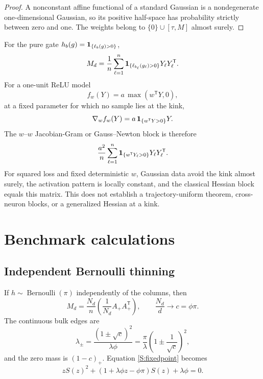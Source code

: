 \documentclass[
  aps,
  prl,
  10pt,
  onecolumn,
  longbibliography,
  nofootinbib
]{revtex4-2}
\theoremstyle{remark}
\begin{document}
\begin{proof}
A nonconstant affine functional of a standard Gaussian is a nondegenerate one-dimensional Gaussian, so its positive half-space has probability strictly between zero and one. The weights belong to $\{0\}\cup[\tau,M]$ almost surely.
\end{proof}

For the pure gate $h_b(g)=\mathbf{1}_{\{\ell_b(g)>0\}}$,
\begin{equation}
M_d=\frac1n\sum_{\ell=1}^n
\mathbf{1}_{\{\ell_{b_\ell}(g_\ell)>0\}}Y_\ell Y_\ell^{\mathsf T}.
\end{equation}
For a one-unit ReLU model
\begin{equation}
f_w(Y)=a\,\max(w^{\mathsf T}Y,0),
\end{equation}
at a fixed parameter for which no sample lies at the kink,
\begin{equation}
\nabla_w f_w(Y)=a\,\mathbf{1}_{\{w^{\mathsf T}Y>0\}}Y.
\end{equation}
The $w$--$w$ Jacobian-Gram or Gauss--Newton block is therefore
\begin{equation}
\frac{a^2}{n}\sum_{\ell=1}^n
\mathbf{1}_{\{w^{\mathsf T}Y_\ell>0\}}Y_\ell Y_\ell^{\mathsf T}.
\end{equation}
For squared loss and fixed deterministic $w$, Gaussian data avoid the kink almost surely, the activation pattern is locally constant, and the classical Hessian block equals this matrix. This does not establish a trajectory-uniform theorem, cross-neuron blocks, or a generalized Hessian at a kink.

\section{Benchmark calculations}

\subsection{Independent Bernoulli thinning}

If $h\sim\operatorname{Bernoulli}(\pi)$ independently of the columns, then
\begin{equation}
M_d=\frac{N_d}{n}
\left(\frac1{N_d}A_+A_+^{\mathsf T}\right),
\qquad
\frac{N_d}{d}\to c=\phi\pi.
\end{equation}
The continuous bulk edges are
\begin{equation}
\lambda_\pm=
\frac{(1\pm\sqrt c)^2}{\lambda\phi}
=
\frac{\pi}{\lambda}
\left(1\pm\frac1{\sqrt c}\right)^2,
\end{equation}
and the zero mass is $(1-c)_+$. Equation \eqref{S:fixedpoint} becomes
\begin{equation}
zS(z)^2+
(1+\lambda\phi z-\phi\pi)S(z)+\lambda\phi=0.
\end{equation}
\end{document}
